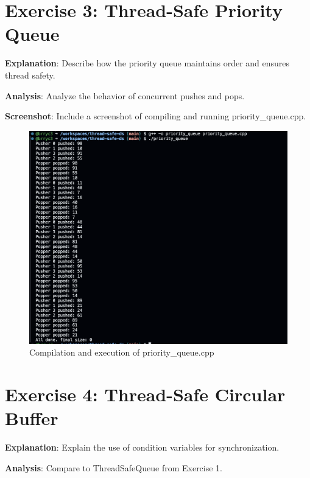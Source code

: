 \section{Exercise 3: Thread-Safe Priority Queue}


\textbf{Explanation}: Describe how the priority queue maintains order and ensures thread safety.

\textbf{Analysis}: Analyze the behavior of concurrent pushes and pops.

\textbf{Screenshot}: Include a screenshot of compiling and running priority_queue.cpp.
\begin{figure}[h]
    \centering
    \includegraphics[width=\textwidth]{2_screenshot.png}
    \caption{Compilation and execution of priority_queue.cpp}
\end{figure}

\section{Exercise 4: Thread-Safe Circular Buffer}


\textbf{Explanation}: Explain the use of condition variables for synchronization.

\textbf{Analysis}: Compare to ThreadSafeQueue from Exercise 1.

